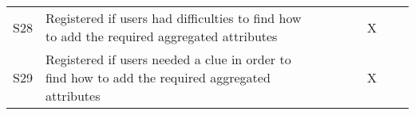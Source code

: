 \begin{longtable}{@{}lm{7cm}ccccccc@{}}
    S28         & Registered if users had difficulties to find how to add the required aggregated attributes                                                              &                                                &                                                &                                                &                                                & X                                              &                                                &                                                \\
    S29         & Registered if users needed a clue in order to find how to add the required aggregated attributes                                                        &                                                &                                                &                                                &                                                & X                                              &                                                &                                                \\* \bottomrule
    \end{longtable}



